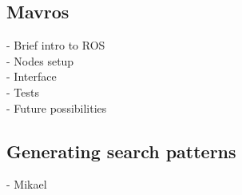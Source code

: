 \subsection{Mavros}
- Brief intro to ROS\\
- Nodes setup\\
- Interface\\
- Tests\\
- Future possibilities\\
\subsection{Generating search patterns}
- Mikael\\
\newpage